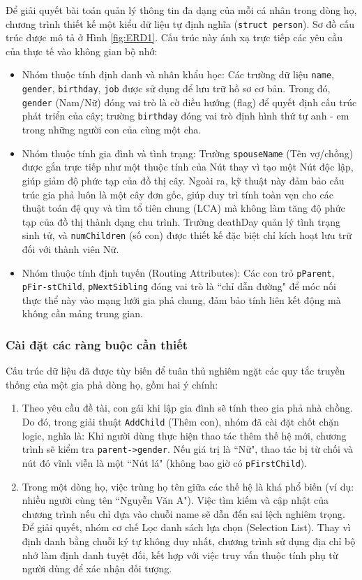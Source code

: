 Để giải quyết bài toán quản lý thông tin đa dạng của mỗi cá nhân trong dòng họ, chương trình thiết kế một kiểu dữ liệu tự định nghĩa (\texttt{struct person}). Sơ đồ cấu trúc được mô tả ở Hình \ref{fig:ERD1}. Cấu trúc này ánh xạ trực tiếp các yêu cầu của thực tế vào không gian bộ nhớ:
\begin{itemize}
	\item Nhóm thuộc tính định danh và nhân khẩu học: Các trường dữ liệu \texttt{name}, \texttt{gender}, \texttt{birthday}, \texttt{job} được sử dụng để lưu trữ hồ sơ cơ bản. Trong đó, \texttt{gender} (Nam/Nữ) đóng vai trò là cờ điều hướng (flag) để quyết định cấu trúc phát triển của cây; trường \texttt{birthday} đóng vai trò định hình thứ tự anh - em trong những người con của cùng một cha.
	\item Nhóm thuộc tính gia đình và tình trạng: Trường \texttt{spouseName} (Tên vợ/chồng) được gắn trực tiếp như một thuộc tính của Nút thay vì tạo một Nút độc lập, giúp giảm độ phức tạp của đồ thị cây. Ngoài ra, kỹ thuật này đảm bảo cấu trúc gia phả luôn là một cây đơn gốc, giúp duy trì tính toàn vẹn cho các thuật toán đệ quy và tìm tổ tiên chung (LCA) mà không làm tăng độ phức tạp của đồ thị thành dạng chu trình. Trường deathDay quản lý tình trạng sinh tử, và \texttt{numChildren} (số con) được thiết kế đặc biệt chỉ kích hoạt lưu trữ đối với thành viên Nữ. 
	\item Nhóm thuộc tính định tuyến (Routing Attributes): Các con trỏ \texttt{pParent}, \texttt{pFir-stChild}, \texttt{pNextSibling} đóng vai trò là ``chỉ dẫn đường" để móc nối thực thể này vào mạng lưới gia phả chung, đảm bảo tính liên kết động mà không cần mảng trung gian.
\end{itemize}


\subsubsection{Cài đặt các ràng buộc cần thiết}
Cấu trúc dữ liệu đã được tùy biến để tuân thủ nghiêm ngặt các quy tắc truyền thống của một gia phả dòng họ, gồm hai ý chính:
\begin{enumerate}
	\item Theo yêu cầu đề tài, con gái khi lập gia đình sẽ tính theo gia phả nhà chồng. Do đó, trong giải thuật \texttt{AddChild} (Thêm con), nhóm đã cài đặt chốt chặn logic, nghĩa là: Khi người dùng thực hiện thao tác thêm thế hệ mới, chương trình sẽ kiểm tra \texttt{parent->gender}. Nếu giá trị là ``Nữ", thao tác bị từ chối và nút đó vĩnh viễn là một ``Nút lá" (không bao giờ có \texttt{pFirstChild}).
	\item Trong một dòng họ, việc trùng họ tên giữa các thế hệ là khá phổ biến (ví dụ: nhiều người cùng tên ``Nguyễn Văn A"). Việc tìm kiếm và cập nhật của chương trình nếu chỉ dựa vào chuỗi name sẽ dẫn đến sai lệch nghiêm trọng. Để giải quyết, nhóm cơ chế Lọc danh sách lựa chọn (Selection List). Thay vì định danh bằng chuỗi ký tự không duy nhất, chương trình sử dụng địa chỉ bộ nhớ làm định danh tuyệt đối, kết hợp với việc truy vấn thuộc tính phụ từ người dùng để xác nhận đối tượng.
\end{enumerate}

